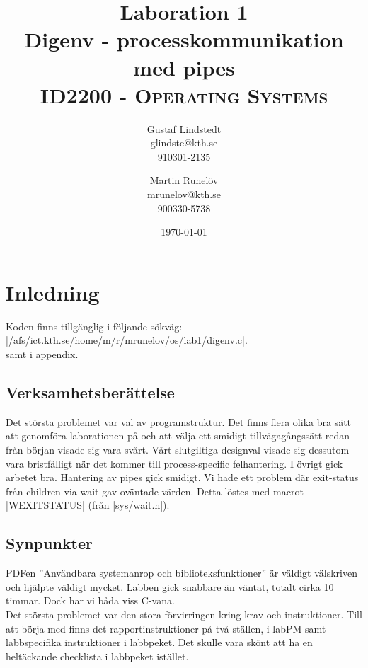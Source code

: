 \documentclass[paper=a4, fontsize=11pt]{scrartcl} %
\title{ 
\huge Laboration 1 \\ Digenv - processkommunikation med pipes \\ %
\vspace{10pt}
\normalfont \normalsize 
\textsc{ID2200 - Operating Systems } \\ [25pt] %
}
\author{Gustaf Lindstedt \\ glindste@kth.se \\ 910301-2135 \and Martin Runelöv \\ mrunelov@kth.se \\ 900330-5738}
\date{\vspace{8pt}\normalsize\today} %
\numberwithin{equation}{section} %
\numberwithin{figure}{section} %
\numberwithin{table}{section} %
\begin{document}
\maketitle

\section{Inledning}

Koden finns tillgänglig i följande sökväg:\\
|/afs/ict.kth.se/home/m/r/mrunelov/os/lab1/digenv.c|.\\

samt i appendix.



\subsection{Verksamhetsberättelse}
Det största problemet var val av programstruktur. 
Det finns flera olika bra sätt att genomföra laborationen på och att välja ett smidigt tillvägagångssätt redan från början visade sig vara svårt. Vårt slutgiltiga designval visade sig dessutom vara bristfälligt när det kommer till process-specific felhantering. I övrigt gick arbetet bra. Hantering av pipes gick smidigt. Vi hade ett problem där exit-status från children via wait gav oväntade värden. Detta löstes med macrot |WEXITSTATUS| (från |sys/wait.h|). \\


\subsection{Synpunkter}
PDFen ''Användbara systemanrop och biblioteksfunktioner'' är väldigt välskriven och hjälpte väldigt mycket.
Labben gick snabbare än väntat, totalt cirka 10 timmar. Dock har vi båda viss C-vana.\\

Det största problemet var den stora förvirringen kring krav och instruktioner. 
Till att börja med finns det rapportinstruktioner på två ställen, i labPM samt labbspecifika instruktioner i labbpeket. 
Det skulle vara skönt att ha en heltäckande checklista i labbpeket istället. \\
\end{document}
